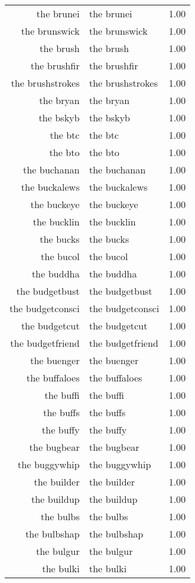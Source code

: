 \begin{table}[ht]
\begin{tabular}{rlr}
  the brunei & the brunei & 1.00 \\ 
  the brunswick & the brunswick & 1.00 \\ 
  the brush & the brush & 1.00 \\ 
  the brushfir & the brushfir & 1.00 \\ 
  the brushstrokes & the brushstrokes & 1.00 \\ 
  the bryan & the bryan & 1.00 \\ 
  the bskyb & the bskyb & 1.00 \\ 
  the btc & the btc & 1.00 \\ 
  the bto & the bto & 1.00 \\ 
  the buchanan & the buchanan & 1.00 \\ 
  the buckalews & the buckalews & 1.00 \\ 
  the buckeye & the buckeye & 1.00 \\ 
  the bucklin & the bucklin & 1.00 \\ 
  the bucks & the bucks & 1.00 \\ 
  the bucol & the bucol & 1.00 \\ 
  the buddha & the buddha & 1.00 \\ 
  the budgetbust & the budgetbust & 1.00 \\ 
  the budgetconsci & the budgetconsci & 1.00 \\ 
  the budgetcut & the budgetcut & 1.00 \\ 
  the budgetfriend & the budgetfriend & 1.00 \\ 
  the buenger & the buenger & 1.00 \\ 
  the buffaloes & the buffaloes & 1.00 \\ 
  the buffi & the buffi & 1.00 \\ 
  the buffs & the buffs & 1.00 \\ 
  the buffy & the buffy & 1.00 \\ 
  the bugbear & the bugbear & 1.00 \\ 
  the buggywhip & the buggywhip & 1.00 \\ 
  the builder & the builder & 1.00 \\ 
  the buildup & the buildup & 1.00 \\ 
  the bulbs & the bulbs & 1.00 \\ 
  the bulbshap & the bulbshap & 1.00 \\ 
  the bulgur & the bulgur & 1.00 \\ 
  the bulki & the bulki & 1.00 \\ 

\end{tabular}
\end{table}
